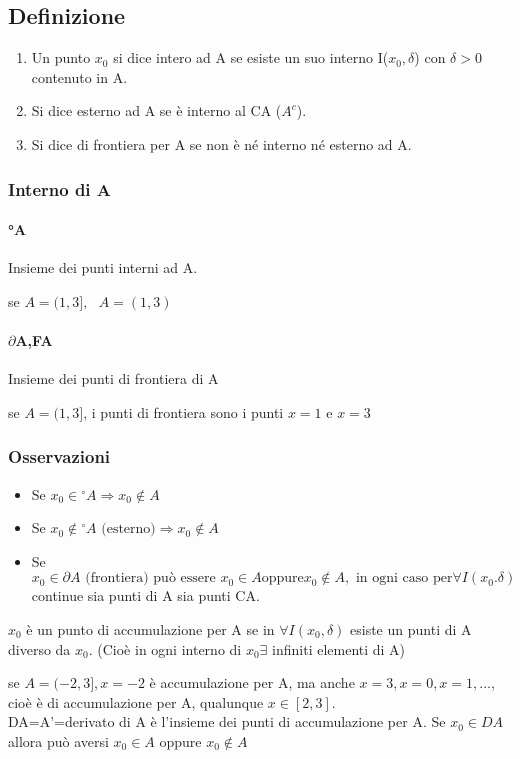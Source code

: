 \subsection{Definizione}

\begin{enumerate}
	\item Un punto $x_0$ si dice intero ad A se esiste un suo interno I($x_0,\delta$)
con $\delta>0$ contenuto in A.
	\item Si dice esterno ad A se è interno al CA ($A^c$).
	\item Si dice di frontiera per A se non è né interno né esterno ad A.
\end{enumerate}
\clearpage

\subsubsection{Interno di A}

\paragraph{°A} Insieme dei punti interni ad A.
\begin{esempio}se $A=(1,3],\text{ }A=(1,3)$\end{esempio}
\paragraph{$\partial$A,FA} Insieme dei punti di frontiera di A
\begin{esempio}se $A=(1,3]$, i punti di frontiera sono i punti $x=1$ e
$x=3$\end{esempio}

\subsubsection{Osservazioni}
\begin{itemize}
	\item Se $x_0\in {^\circ A}\Rightarrow x_0\notin A$
	\item Se $x_0\notin {^\circ A} \text{ (esterno)} \Rightarrow x_0\notin A$
	\item Se $x_0\in\partial A \text{ (frontiera) può essere }x_0\in A \text{
			oppure} x_0 \notin A, \text{ in ogni caso per} \forall
		I(x_0.\delta) $ continue sia punti di A sia punti CA.
\end{itemize}

\begin{defi}
$x_0$ è un punto di accumulazione per A se in $\forall I(x_0,\delta)$ esiste un
punti di A diverso da $x_0$. (Cioè in ogni interno di $x_0 \exists$ infiniti
elementi di A)
	\begin{esempio}
 se $A=(-2,3],x=-2$ è accumulazione per A, ma anche
$x=3,x=0,x=1,\dots$, cioè è di accumulazione per A, qualunque $x\in [2,3]$.\\
DA=A'=derivato di A è l'insieme dei punti di accumulazione per A. Se $x_0\in
DA$ allora può aversi $x_0\in A$ oppure $x_0\notin A$
	\end{esempio}
\end{defi}

